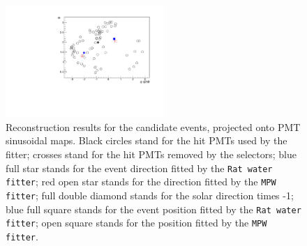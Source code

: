 \begin{figure}[htbp]
{\begin{minipage}[t]{0.4\textwidth}
			\centering
			\includegraphics[width=6cm]{PMTmap_100663.pdf}
		\end{minipage}
	}
	\caption[Reconstruction results for the candidate events, projected onto PMT sinusoidal maps.]{Reconstruction results for the candidate events, projected onto PMT sinusoidal maps. Black circles stand for the hit PMTs used by the fitter; crosses stand for the hit PMTs removed by the selectors; blue full star stands for the event direction fitted by the \texttt{Rat water fitter}; red open star stands for the direction fitted by the \texttt{MPW fitter}; full double diamond stands for the solar direction times -1; blue full square stands for the event position fitted by the \texttt{Rat water fitter}; open square stands for the position fitted by the \texttt{MPW fitter}.	\label{fig:openDataSetCandidate}}
\end{figure}


